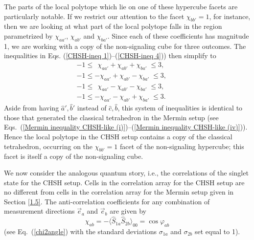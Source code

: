 The parts of the local polytope which lie on one of these hypercube facets are particularly notable. If we restrict our attention to the facet $\chi_{bb'}=1$, for instance, then we are looking at what part of the local polytope falls in the region parametrized by $\chi_{aa'}$, $\chi_{ab'}$ and $\chi_{ba'}$. Since each of these coefficients has magnitude 1, we are working with a copy of the non-signaling cube for three outcomes. The inequalities in Eqs. (\ref{CHSH-ineq 1})--(\ref{CHSH-ineq 4})) then simplify to
\begin{eqnarray}
-1 \le \;\, \chi_{aa'} + \chi_{ab'} + \chi_{ba'}\; \le 3, & & \\[.2cm]
-1\le -\chi_{aa'}+\chi_{ab'}-\chi_{ba'} \; \le  3, & & \\[.2cm]
-1\le \;\, \chi_{aa'}-\chi_{ab'}-\chi_{ba'} \; \le  3, & & \\[.2cm]
-1\le  -\chi_{aa'}-\chi_{ab'}+\chi_{ba'} \; \le 3. & &
\end{eqnarray}
Aside from having $\hat{a}',\hat{b}'$ instead of $\hat{c},\hat{b}$, this system of inequalities is identical to those that generated the classical tetrahedron in the Mermin setup (see Eqs.\ (\ref{Mermin inequality CHSH-like (i)})--(\ref{Mermin inequality CHSH-like (iv)})). Hence the local polytope in the CHSH setup contains a copy of the classical tetrahedron, occurring on the $\chi_{bb'}=1$ facet of the non-signaling hypercube; this facet is itself a copy of the non-signaling cube.

We now consider the analogous quantum story, i.e., the correlations of the singlet state for the CHSH setup. Cells in the correlation array for the CHSH setup are no different from cells in the correlation array for the Mermin setup given in Section \ref{1.5}. The anti-correlation coefficients for any combination of measurement directions $\vec{e}_a$ and $\vec{e}_b$ are given by  
\begin{equation}
\chi_{ab} =-\langle \hat{S}_{1a}\hat{S}_{2b}\rangle_{00} =  \cos\varphi_{ab}
\end{equation}
(see Eq.\ (\ref{chi2angle}) with the standard deviations $\sigma_{1a}$ and $\sigma_{2b}$ set equal to 1). 

